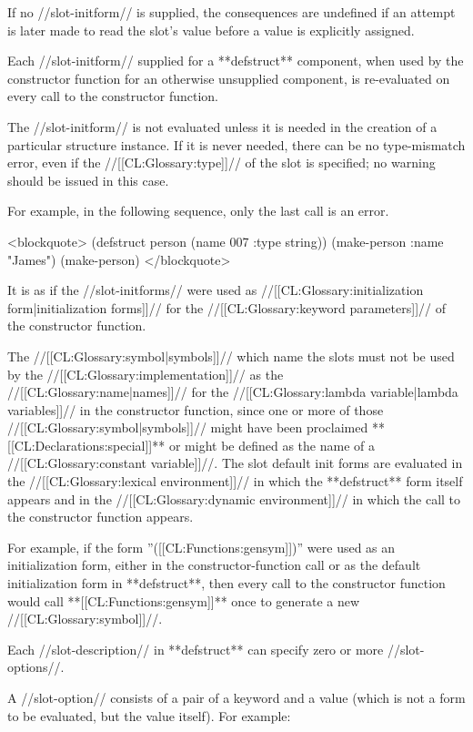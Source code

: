 If no //slot-initform// is supplied, the consequences are undefined if an attempt is later made to read the slot's value before a value is explicitly assigned.

Each //slot-initform// supplied for a **defstruct** component, when used by the constructor function for an otherwise unsupplied component, is re-evaluated on every call to the constructor function.

The //slot-initform// is not evaluated unless it is needed in the creation of a particular structure instance. If it is never needed, there can be no type-mismatch error, even if the //[[CL:Glossary:type]]// of the slot is specified; no warning should be issued in this case.

For example, in the following sequence, only the last call is an error.

<blockquote> 
(defstruct person (name 007 :type string)) 
(make-person :name "James") 
(make-person)
</blockquote>

It is as if the //slot-initforms// were used as //[[CL:Glossary:initialization form|initialization forms]]// for the //[[CL:Glossary:keyword parameters]]// of the constructor function.

The //[[CL:Glossary:symbol|symbols]]// which name the slots must not be used by the //[[CL:Glossary:implementation]]// as the //[[CL:Glossary:name|names]]// for the //[[CL:Glossary:lambda variable|lambda variables]]// in the constructor function, since one or more of those //[[CL:Glossary:symbol|symbols]]// might have been proclaimed **[[CL:Declarations:special]]** or might be defined as the name of a //[[CL:Glossary:constant variable]]//. The slot default init forms are evaluated in the //[[CL:Glossary:lexical environment]]// in which the **defstruct** form itself appears and in the //[[CL:Glossary:dynamic environment]]// in which the call to the constructor function appears.

For example, if the form ''([[CL:Functions:gensym]])'' were used as an initialization form, either in the constructor-function call or as the default initialization form in **defstruct**, then every call to the constructor function would call **[[CL:Functions:gensym]]** once to generate a new //[[CL:Glossary:symbol]]//.

Each //slot-description// in **defstruct** can specify zero or more //slot-options//.

A //slot-option// consists of a pair of a keyword and a value (which is not a form to be evaluated, but the value itself). For example:


